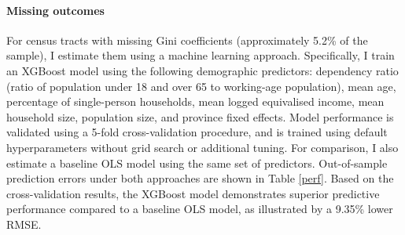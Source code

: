 \paragraph{Missing outcomes} For census tracts with missing Gini coefficients (approximately 5.2\% of the sample), I estimate them using a machine learning approach. Specifically, I train an XGBoost model using the following demographic predictors: dependency ratio (ratio of population under 18 and over 65 to working-age population), mean age, percentage of single-person households, mean logged equivalised income, mean household size, population size, and province fixed effects. Model performance is validated using a 5-fold cross-validation procedure, and is trained using default hyperparameters without grid search or additional tuning. For comparison, I also estimate a baseline OLS model using the same set of predictors. Out-of-sample prediction errors under both approaches are shown in Table \ref{perf}. Based on the cross-validation results, the XGBoost model demonstrates superior predictive performance compared to a baseline OLS model, as illustrated by a 9.35\% lower RMSE.

\begin{table}[H]
\centering
{}
\end{table}


